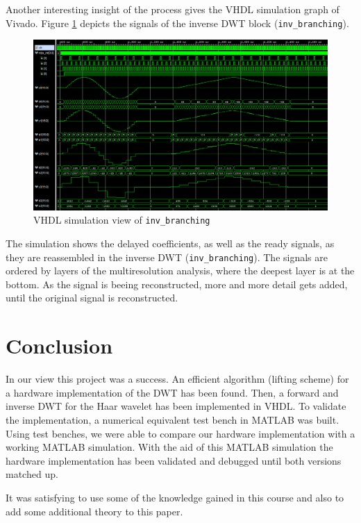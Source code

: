 \begin{refsection}
Another interesting insight of the process gives the VHDL simulation graph of Vivado.
Figure \ref{fpga:fig:sim} depicts the signals of the inverse DWT block (\texttt{inv\_branching}).
\begin{figure}
	\centering
	\includegraphics[width=\textwidth]{papers/fpga/images/inv_branching_screenshot.PNG}
	\caption{VHDL simulation view of \texttt{inv\_branching} \label{fpga:fig:sim}}
\end{figure}
The simulation shows the delayed coefficients, as well as the ready signals, as they are reassembled in the inverse DWT (\texttt{inv\_branching}).
The signals are ordered by layers of the multiresolution analysis, where the deepest layer is at the bottom.
As the signal is beeing reconstructed, more and more detail gets added, until the original signal is reconstructed.

\section{Conclusion}

In our view this project was a success.
An efficient algorithm (lifting scheme) for a hardware implementation of the DWT has been found.
Then, a forward and inverse DWT for the Haar wavelet has been implemented in VHDL.
To validate the implementation, a numerical equivalent test bench in MATLAB was built.
Using test benches, we were able to compare our hardware implementation with a working MATLAB simulation.
With the aid of this MATLAB simulation the hardware implementation has been validated and debugged until both versions matched up.

It was satisfying to use some of the knowledge gained in this course and also to add some additional theory to this paper.


\end{refsection}
